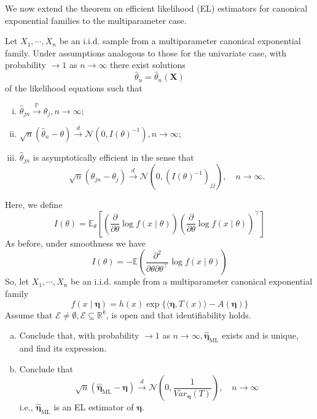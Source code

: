 \begin{ex}
    We now extend the theorem on efficient likelihood (EL) estimators for canonical exponential families to the multiparameter case. 

    Let \(X_{1}, \cdots, X_{n}\) be an i.i.d. sample from a multiparameter canonical exponential family. Under assumptions analogous to those for the univariate case, with probability \(\rightarrow 1\) as \(n \rightarrow \infty\) there exist solutions
    \[
        \widehat{\theta}_{n}=\hat{\theta}_{n}(\mathbf{X})
    \]
    of the likelihood equations such that 
    \begin{enumerate}[(i)]
        \item \(\hat{\theta}_{j n} \stackrel{\mathbb{P}}{\rightarrow} \theta_{j}, n \rightarrow \infty\); 
        \item \(\sqrt{n}\left(\widehat{\theta}_{n}-\theta\right) \stackrel{d}{\rightarrow} \mathcal{N}\left(0, I(\theta)^{-1}\right), n \rightarrow \infty\); 
        \item \(\widehat{\theta}_{j n}\) is asymptotically efficient in the sense that
        \[
            \sqrt{n}\left(\hat{\theta}_{j n}-\theta_{j}\right) \stackrel{d}{\rightarrow} \mathcal{N}\left(0,\left(I(\theta)^{-1}\right)_{j j}\right), \quad n \rightarrow \infty. 
        \]
    \end{enumerate}
    Here, we define
    \[
        I(\theta)=\mathbb{E}_{\theta}\left[\left(\frac{\partial}{\partial \theta} \log f(x \mid \theta)\right)\left(\frac{\partial}{\partial \theta} \log f(x \mid \theta)\right)^{\top}\right]
    \]
    As before, under smoothness we have
    \[
        I(\theta)=-\mathbb{E}\left(\frac{\partial^{2}}{\partial \theta \partial \theta^{\top}} \log f(x \mid \theta)\right)
    \]
    So, let \(X_{1}, \cdots, X_{n}\) be an i.i.d. sample from a multiparameter canonical exponential family
    \[
        f(x \mid \boldsymbol{\eta})=h(x) \exp \{\langle\boldsymbol{\eta}, T(x)\rangle-A(\boldsymbol{\eta})\}
    \]
    Assume that \(\mathcal{E} \neq \emptyset, \mathcal{E} \subseteq \mathbb{R}^{k}\), is open and that identifiability holds. 
    \begin{enumerate}[(a)]
        \item Conclude that, with probability \(\rightarrow 1\) as \(n \rightarrow \infty, \widehat{\boldsymbol{\eta}}_{\mathrm{ML}}\) exists and is unique, and find its expression. 
        \item Conclude that
        \[
            \sqrt{n}\left(\widehat{\boldsymbol{\eta}}_{\mathrm{ML}}-\boldsymbol{\eta}\right) \stackrel{d}{\rightarrow} \mathcal{N}\left(0, \frac{1}{Var_{\boldsymbol{\eta}}(T)}\right), \quad n \rightarrow \infty
        \]
        i.e., \(\widehat{\boldsymbol{\eta}}_{\mathrm{ML}}\) is an EL estimator of \(\boldsymbol{\eta}\).
    \end{enumerate}
\end{ex}

